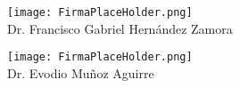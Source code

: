 \documentclass[
  12pt,
  letterpaper,
  spanish
]{letter}
\newcommand{\directorUno}{Francisco Gabriel Hernández Zamora}
\newcommand{\directorDos}{Evodio Muñoz Aguirre}
\begin{document}
\begin{letter}
\begin{multicols}{3}
  \columnbreak 

\begin{center}
  \texttt{[image: FirmaPlaceHolder.png]}\\
  Dr. \directorUno
\end{center}
  
  \columnbreak 
  
\begin{center}
  \texttt{[image: FirmaPlaceHolder.png]}\\
  Dr. \directorDos
\end{center}
\end{multicols}

\end{letter}
\end{document}
